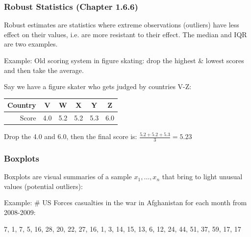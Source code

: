 \documentclass[handout]{beamer}
\newcommand{\blue}[1]{\textcolor{blue2}{#1}}
\begin{document}
\begin{frame}
\frametitle{Robust Statistics (Chapter 1.6.6)}
\blue{Robust estimates} are statistics where extreme observations (outliers) have less effect on their values, i.e. are more resistant to their effect.  The median and IQR are two examples.  

\vspace{0.25cm}

\pause Example:  Old scoring system in figure skating: \blue{drop the highest \& lowest scores} and then take the average.  

\vspace{0.25cm}

\pause Say we have a figure skater who gets judged by countries V-Z:
\begin{center}
\begin{tabular}{r||ccccc}
\hline
Country & V & W & X & Y & Z \\ 
\hline
Score & 4.0 & 5.2 & 5.2 & 5.3 & 6.0 \\ 
\hline
\end{tabular}
\end{center}

\vspace{0.25cm}

\pause Drop the 4.0 and 6.0, then the final score is: $\frac{5.2 + 5.2 + 5.3}{3} = 5.23$
\end{frame}


\begin{frame}
\frametitle{Boxplots}
\blue{Boxplots} are visual summaries of a sample $x_1,\ldots,x_n$ that bring to light unusual values (potential outliers):

\vspace{0.5cm}

\pause Example: \# US Forces casualties in the war in Afghanistan for each month from 2008-2009:  

\vspace{0.5cm}

7, 1, 7, 5, 16, 28, 20, 22, 27, 16, 1, 3, 14, 15, 13, 6, 12, 24, 44, 51, 37, 59, 17, 17


\end{frame}
\end{document}
